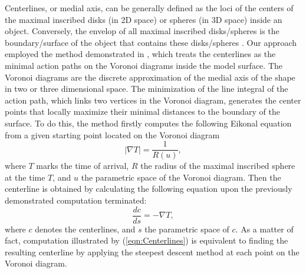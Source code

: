 Centerlines, or medial axis, can be generally defined as the loci of the centers of the maximal inscribed disks (in 2D space) or spheres (in 3D space) inside an object.
Conversely, the envelop of all maximal inscribed disks/spheres is the boundary/surface of the object that contains these disks/spheres \cite{Amenta2001}.
Our approach employed the method demonstrated in \cite{Antiga2003}, which treats the centerlines as the minimal action paths on the Voronoi diagrams inside the model surface.
The Voronoi diagrams are the discrete approximation of the medial axis of the shape in two or three dimensional space.
The minimization of the line integral of the action path, which links two vertices in the Voronoi diagram, generates the center points that locally maximize their minimal distances to the boundary of the surface.
To do this, the method firstly computes the following Eikonal equation from a given starting point located on the Voronoi diagram
\begin{equation}
\label{eqn:Voronoi}
\left| \nabla T \right| = \frac{1}{R(u)},
\end{equation}
where $T$ marks the time of arrival, $R$ the radius of the maximal inscribed sphere at the time $T$, and $u$ the parametric space of the Voronoi diagram.
Then the centerline is obtained by calculating the following equation upon the previously demonstrated computation terminated:
\begin{equation}
\label{eqn:Centerlines}
\frac{dc}{ds} = - \nabla T,
\end{equation}
where $c$ denotes the centerlines, and $s$ the parametric space of $c$.
As a matter of fact, computation illustrated by (\ref{eqn:Centerlines}) is equivalent to finding the resulting centerline by applying the steepest descent method at each point on the Voronoi diagram. 